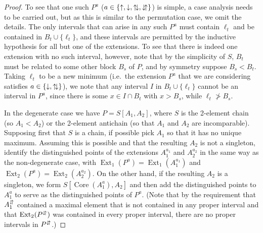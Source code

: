 \documentclass[11pt]{article}
\begin{document}
\begin{proof}
To see that one such $P^a$ ($a\in\{\uparrow,\downarrow,{{\uparrow\hspace{-2pt}\downarrow}},{{\downarrow\hspace{-2pt}\uparrow}}\}$) is simple, a case analysis needs to be carried out, but as this is similar to the permutation case, we omit the details.  The only intervals that can arise in any such $P^a$ must contain $\ell_t$ and be contained in $B_t\cup\{\ell_t\}$, and these intervals are permitted by the inductive hypothesis for all but one of the extensions. To see that there is indeed one extension with no such interval, however, note that by the simplicity of $S$, $B_t$ must be related to some other block $B_s$ of $P$, and by symmetry suppose $B_s<B_t$. Taking $\ell_t$ to be a new minimum (i.e.\ the extension $P^a$ that we are considering satisfies $a\in\{\downarrow,{{\uparrow\hspace{-2pt}\downarrow}}\}$), we note that any interval $I$ in $B_t\cup\{\ell_t\}$ cannot be an interval in $P^a$, since there is some $x\in I\cap B_t$ with $x>B_s$, while $\ell_t\ngtr B_s$.

In the degenerate case we have $P=S[A_1,A_2]$, where $S$ is the 2-element chain (so $A_1<A_2$) or the 2-element
antichain (so that $A_1$ and $A_2$ are incomparable). Supposing first that $S$ is a chain, if possible pick $A_1$ so that it has no unique maximum. Assuming this is possible and that the resulting $A_2$ is not a singleton, identify the distinguished points of the extensions $A_1^{a_1}$ and $A_2^{a_2}$ in the same way as the non-degenerate case, with ${\operatorname{Ext}}_1(P^a)={\operatorname{Ext}}_1(A_1^{a_1})$ and ${\operatorname{Ext}}_2(P^a)={\operatorname{Ext}}_2(A_2^{a_2})$. On the other hand, if the resulting $A_2$ is a singleton, we form $S[{\operatorname{Core}}(A_1^a),A_2]$ and then add the distinguished points to $A_1^a$ to serve as the distinguished points of $P^a$. (Note that by the requirement that $A_1^{{\downarrow\hspace{-2pt}\uparrow}}$ contained a maximal element that is not contained in any proper interval and that ${\operatorname{Ext}}_2(P^{{\downarrow\hspace{-2pt}\uparrow}})$ was contained in every proper interval, there are no proper intervals in $P^{{\downarrow\hspace{-2pt}\uparrow}}$.)


\end{proof}
\end{document}
